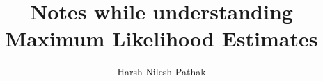 \documentclass{ucbthesis}
\begin{document}
    
    \title{Notes while understanding Maximum Likelihood Estimates}
    \author{Harsh Nilesh Pathak}

    
    
    
    \maketitle
    
    
    
    
    \begin{frontmatter}
    
        
        \tableofcontents
        \clearpage



        
    \end{frontmatter}
\end{document}
